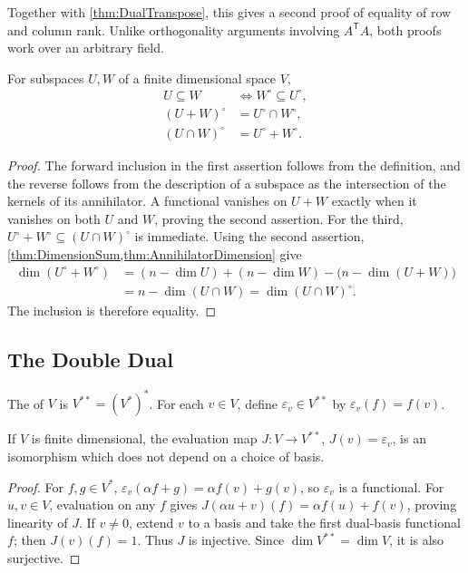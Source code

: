 \begin{Remark*}
Together with \cref{thm:DualTranspose}, this gives a second proof of equality of row and column rank. Unlike orthogonality arguments involving $A^{\mathsf T}A$, both proofs work over an arbitrary field.
\end{Remark*}

\begin{Theorem}
For subspaces $U,W$ of a finite dimensional space $V$,
\begin{align*}
U\subseteq W&\iff W^\circ\subseteq U^\circ,\\
(U+W)^\circ&=U^\circ\cap W^\circ,\\
(U\cap W)^\circ&=U^\circ+W^\circ.
\end{align*}
\end{Theorem}
\begin{proof}
The forward inclusion in the first assertion follows from the definition, and the reverse follows from the description of a subspace as the intersection of the kernels of its annihilator. A functional vanishes on $U+W$ exactly when it vanishes on both $U$ and $W$, proving the second assertion. For the third, $U^\circ+W^\circ\subseteq(U\cap W)^\circ$ is immediate. Using the second assertion, \cref{thm:DimensionSum,thm:AnnihilatorDimension} give
\begin{align*}
\dim(U^\circ+W^\circ)&=(n-\dim U)+(n-\dim W)-\bigl(n-\dim(U+W)\bigr)\\
&=n-\dim(U\cap W)=\dim(U\cap W)^\circ.
\end{align*}
The inclusion is therefore equality.
\end{proof}

\subsection{The Double Dual}

\begin{Definition}
The  of $V$ is $V^{**}=(V^*)^*$. For each $v\in V$, define $\varepsilon_v\in V^{**}$ by $\varepsilon_v(f)=f(v)$.
\end{Definition}

\begin{Theorem}
If $V$ is finite dimensional, the evaluation map $J\colon V\to V^{**}$, $J(v)=\varepsilon_v$, is an isomorphism which does not depend on a choice of basis.
\end{Theorem}
\begin{proof}
For $f,g\in V^*$, $\varepsilon_v(\alpha f+g)=\alpha f(v)+g(v)$, so $\varepsilon_v$ is a functional. For $u,v\in V$, evaluation on any $f$ gives $J(\alpha u+v)(f)=\alpha f(u)+f(v)$, proving linearity of $J$. If $v\ne0$, extend $v$ to a basis and take the first dual-basis functional $f$; then $J(v)(f)=1$. Thus $J$ is injective. Since $\dim V^{**}=\dim V$, it is also surjective.
\end{proof}
